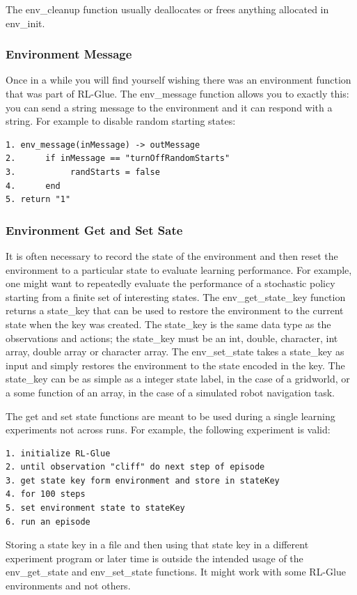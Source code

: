 \documentclass[11pt]{article}
\begin{document}
The env\_cleanup function usually deallocates or frees anything allocated in env\_init.

\subsubsection{Environment Message}
Once in a while you will find yourself wishing there was an environment function that was part of RL-Glue. The env\_message function allows you to exactly this: you can send a string message to the environment and it can respond with a string. For example to disable random starting states:
\begin{verbatim}
1. env_message(inMessage) -> outMessage
2.      if inMessage == "turnOffRandomStarts"  
3.           randStarts = false
4.      end 
5. return "1"
\end{verbatim}

\subsubsection{Environment Get and Set Sate}
It is often necessary to record the state of the environment and then reset the environment to a particular state to evaluate learning performance. For example, one might want to repeatedly evaluate the performance of a stochastic policy starting from a finite set of interesting states. The env\_get\_state\_key function returns a state\_key that can be used to restore the environment to the current state when the key was created. The state\_key is the same data type as the observations and actions; the state\_key must be an int, double, character, int array, double array or character array. The env\_set\_state takes a state\_key as input and simply restores the environment to the state encoded in the key. The state\_key can be as simple as a integer state label, in the case of a gridworld, or a some function of an array, in the case of a simulated robot navigation task. 

The get and set state functions are meant to be used during a single learning experiments not across runs. For example, the following experiment is valid:
\begin{verbatim}
1. initialize RL-Glue
2. until observation "cliff" do next step of episode
3. get state key form environment and store in stateKey
4. for 100 steps
5. set environment state to stateKey
6. run an episode
\end{verbatim}
Storing a state key in a file and then using that state key in a different experiment program or later time is outside the intended usage of the env\_get\_state and env\_set\_state functions. It might work with some RL-Glue environments and not others.
        
\end{document}
